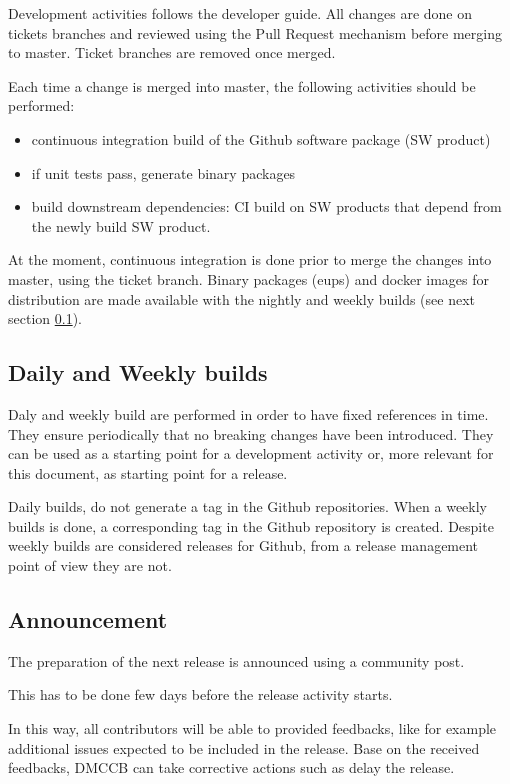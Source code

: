 Development activities follows the \citep{DevGuide} developer guide. All changes are done on tickets branches and reviewed using the Pull Request mechanism before merging to master.
Ticket branches are removed once merged.

Each time a change is merged into master, the following activities should be performed:

\begin{itemize}
\item continuous integration build of the Github software package (SW product)
\item if unit tests pass, generate binary packages
\item build downstream dependencies: CI build on SW products that depend from the newly build SW product.
\end{itemize}

At the moment, continuous integration is done prior to merge the changes into master, using the ticket branch. Binary packages (eups) and docker images for distribution are made available with the nightly and weekly builds (see next section \ref{sect:weekly}).


\subsection{Daily and Weekly builds} \label{sect:weekly}

Daly and weekly build are performed in order to have fixed references in time.
They ensure periodically that no breaking changes have been introduced. 
They can be used as a starting point for a development activity or, more relevant for this document, as starting point for a release.

Daily builds, do not generate a tag in the Github repositories. 
When a weekly builds is done, a corresponding tag in the Github repository is created.
Despite weekly builds are considered releases for Github, from a release management point of view they are not.

 
\subsection{Announcement} \label{sect:anaouncement}

The preparation of the next release is announced using a community post.

This has to be done few days before the release activity starts.

In this way, all contributors will be able to provided feedbacks, like for example additional issues expected to be included in the release.
Base on the received feedbacks, DMCCB can take corrective actions such as delay the release.


